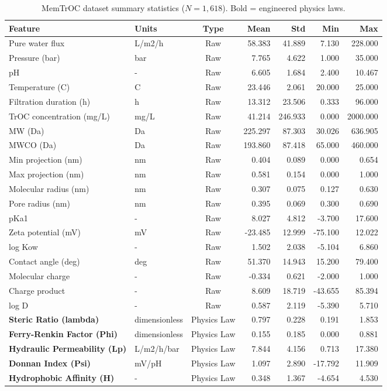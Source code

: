 \begin{table}[htbp]
\centering
\caption{MemTrOC dataset summary statistics ($N=1{,}618$). Bold = engineered physics laws.}
\label{tab:dataset}
\begin{tabular}{llcrrrr}
\toprule
Feature & Units & Type & Mean & Std & Min & Max \\
\midrule
Pure water flux & L/m2/h & Raw & 58.383 & 41.889 & 7.130 & 228.000 \\
Pressure (bar) & bar & Raw & 7.765 & 4.622 & 1.000 & 35.000 \\
pH & - & Raw & 6.605 & 1.684 & 2.400 & 10.467 \\
Temperature (C) & C & Raw & 23.446 & 2.061 & 20.000 & 25.000 \\
Filtration duration (h) & h & Raw & 13.312 & 23.506 & 0.333 & 96.000 \\
TrOC concentration (mg/L) & mg/L & Raw & 41.214 & 246.933 & 0.000 & 2000.000 \\
MW (Da) & Da & Raw & 225.297 & 87.303 & 30.026 & 636.905 \\
MWCO (Da) & Da & Raw & 193.860 & 87.418 & 65.000 & 460.000 \\
Min projection (nm) & nm & Raw & 0.404 & 0.089 & 0.000 & 0.654 \\
Max projection (nm) & nm & Raw & 0.581 & 0.154 & 0.000 & 1.000 \\
Molecular radius (nm) & nm & Raw & 0.307 & 0.075 & 0.127 & 0.630 \\
Pore radius (nm) & nm & Raw & 0.395 & 0.069 & 0.300 & 0.690 \\
pKa1 & - & Raw & 8.027 & 4.812 & -3.700 & 17.600 \\
Zeta potential (mV) & mV & Raw & -23.485 & 12.999 & -75.100 & 12.022 \\
log Kow & - & Raw & 1.502 & 2.038 & -5.104 & 6.860 \\
Contact angle (deg) & deg & Raw & 51.370 & 14.943 & 15.200 & 79.400 \\
Molecular charge & - & Raw & -0.334 & 0.621 & -2.000 & 1.000 \\
Charge product & - & Raw & 8.609 & 18.719 & -43.655 & 85.394 \\
log D & - & Raw & 0.587 & 2.119 & -5.390 & 5.710 \\
\textbf{Steric Ratio (lambda)} & dimensionless & Physics Law & 0.797 & 0.228 & 0.191 & 1.853 \\
\textbf{Ferry-Renkin Factor (Phi)} & dimensionless & Physics Law & 0.155 & 0.185 & 0.000 & 0.881 \\
\textbf{Hydraulic Permeability (Lp)} & L/m2/h/bar & Physics Law & 7.844 & 4.156 & 0.713 & 17.380 \\
\textbf{Donnan Index (Psi)} & mV/pH & Physics Law & 1.097 & 2.890 & -17.792 & 11.909 \\
\textbf{Hydrophobic Affinity (H)} & - & Physics Law & 0.348 & 1.367 & -4.654 & 4.530 \\
\bottomrule
\end{tabular}
\end{table}
